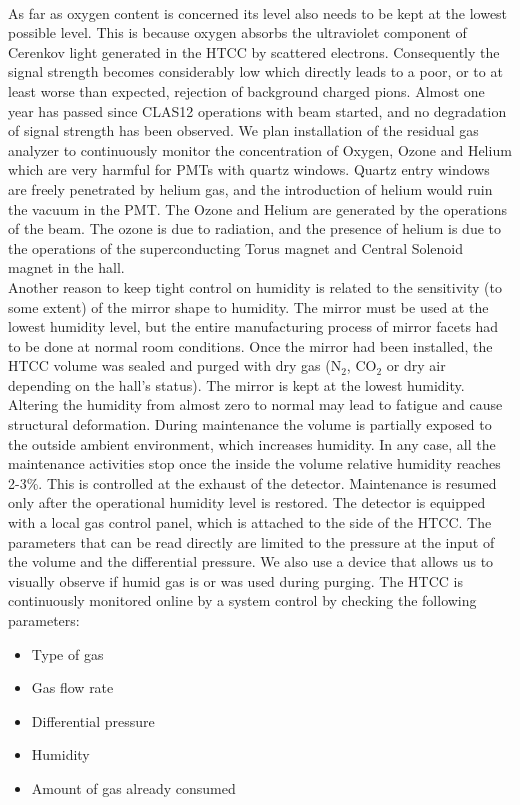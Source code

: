 \\
\indent As far as oxygen content is concerned its level also needs to be kept at the lowest possible level. This is because oxygen absorbs the ultraviolet component of Cerenkov light generated in the HTCC by scattered electrons. Consequently the signal strength becomes considerably low which directly leads to a poor, or to at least worse than expected, rejection of background charged pions. Almost one year has passed since CLAS12 operations with beam started, and no degradation of signal strength has been observed. We plan installation of the residual gas analyzer to  continuously monitor the concentration of Oxygen, Ozone and Helium which are very harmful for PMTs with quartz windows. Quartz entry windows are freely penetrated by helium gas, and the introduction of helium would ruin the vacuum in the PMT. The Ozone and Helium are generated by the operations of the beam. The ozone is due to radiation, and the presence of helium is due to the operations of the superconducting Torus magnet and Central Solenoid magnet in the hall.      
\\
\indent Another reason to keep tight control on humidity is related to the sensitivity (to some extent) of the mirror shape to humidity. The mirror must be used at the lowest humidity level, but the entire manufacturing process of mirror facets had to be done at normal room conditions. Once the mirror had been installed, the HTCC volume was sealed and purged with dry gas (N${_2}$, CO${_2}$ or dry air depending on the hall's status). The mirror is kept at the lowest humidity. Altering the humidity from almost zero to normal may lead to fatigue and cause structural deformation. During maintenance the volume is partially exposed to the outside ambient environment, which increases humidity. In any case, all the maintenance activities stop once the inside the volume relative humidity reaches 2-3\%. This is controlled at the exhaust of the detector. Maintenance is resumed only after the operational humidity level is restored. The detector is equipped with a local gas control panel, which is attached to the side of the HTCC. The parameters that can be read directly are limited to the pressure at the input of the volume and the differential pressure. We also use a device that allows us to visually observe if humid gas is or was used during purging. The HTCC is continuously monitored online by a system control by checking the following parameters:

\begin{itemize}
    \item Type of gas
    \item Gas flow rate
    \item Differential pressure
    \item Humidity
    \item Amount of gas already consumed
\end{itemize}

